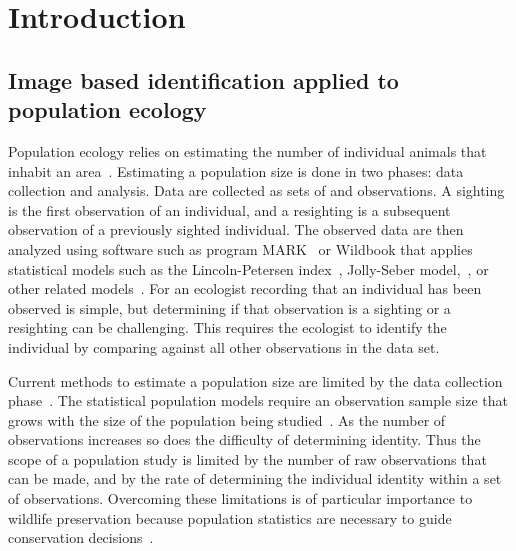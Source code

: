 \begin{comment}
    ./texfix.py --outline --fpaths chapter1-intro.tex
    fixtex --fpaths chapter1-intro.tex --outline --asmarkdown --numlines=999 --shortcite
    ./texfix.py --grep "\\\\[A-Za-z]*[^{a-zA-Z]"
    ./texfix.py --reformat --fpaths figdef1.tex
\end{comment}


\chapter{Introduction}\label{chap:intro}

\section{Image based identification applied to population ecology}

    Population ecology relies on estimating the number of individual animals that inhabit an
    area~\cite{krebs_ecological_1999}. Estimating a population size is done in two phases: data collection and
    analysis. Data are collected as sets of  and  observations. A
    sighting is the first observation of an individual, and a resighting is a subsequent observation of a
    previously sighted individual. The observed data are then analyzed using software such as program
    MARK~\cite{white_program_1999, schwarz_jolly_seber_2006} or Wildbook that applies statistical models such as
    the Lincoln-Petersen index~\cite{seber_estimation_1982}, Jolly-Seber model,~\cite{jolly_explicit_1965,
    seber_note_1965}, or other related models~\cite{cormack_estimates_1964,
    chao_estimating_1987,kenneth._h._pollock_statistical_1990}. For an ecologist recording that an individual has
    been observed is simple, but determining if that observation is a sighting or a resighting can be challenging.
    This requires the ecologist to identify the individual by comparing against all other observations in the data
    set.

    Current methods to estimate a population size are limited by the data collection
    phase~\cite{sundaresan_network_2007, rubenstein_ecology_2010}. The statistical population models require an
    observation sample size that grows with the size of the population being studied~\cite{seber_estimation_1982}.
    As the number of observations increases so does the difficulty of determining identity. Thus the scope of a
    population study is limited by the number of raw observations that can be made, and by the rate of determining
    the individual identity within a set of observations. Overcoming these limitations is of particular importance
    to wildlife preservation because population statistics are necessary to guide conservation
    decisions~\cite{rubenstein_behavioral_1998}.

